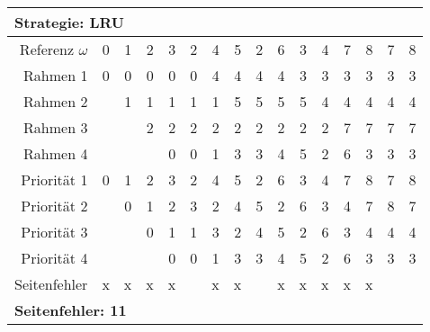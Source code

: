 \documentclass[a4paper, 11pt]{article}
\begin{document}
      \begin{center}
            \begin{tabular}{|r||r|r|r|r|r|r|r|r|r|r|r|r|r|r|r|}
                \multicolumn{16}{l}{\textbf{Strategie: LRU}}\\
                \hline
                     Referenz $\omega$ & 0 & 1 & 2 & 3 & 2 & 4 & 5 & 2 & 6 & 3 & 4 & 7 & 8 & 7 & 8 \\
                \hline\hline
                     Rahmen 1    &0&0&0&0&0&4&4&4&4&3&3&3&3&3&3   \\\hline
                     Rahmen 2    &&1&1&1&1&1&5&5&5&5&4&4&4&4&4   \\\hline
                     Rahmen 3    &&&2&2&2&2&2&2&2&2&2&7&7&7&7   \\\hline
                     Rahmen 4    &&&&0&0&1&3&3&4&5&2&6&3&3&3   \\
                \hline\hline
                     Priorität 1 &0&1&2&3&2&4&5&2&6&3&4&7&8&7&8   \\\hline
                     Priorität 2 &&0&1&2&3&2&4&5&2&6&3&4&7&8&7   \\\hline
                     Priorität 3 &&&0&1&1&3&2&4&5&2&6&3&4&4&4   \\\hline
                     Priorität 4 &&&&0&0&1&3&3&4&5&2&6&3&3&3   \\
                \hline\hline
                     Seitenfehler  &x&x&x&x&&x&x&&x&x&x&x&x&&   \\
                \hline
                \multicolumn{16}{l}{\textbf{Seitenfehler: 11}}\\
            \end{tabular}
            \end{center}
            
\end{document}

